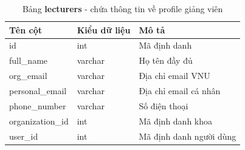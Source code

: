 \documentclass[./../main.tex]{subfiles}
\begin{document}
\begin{table}[H]
	\caption[Bảng lecturers]{Bảng \textbf{lecturers} - chứa thông tin về profile giảng viên}
	\label{tab:db_lecturers}
	\begin{tabular}{|l|l|l|}
	\hline
	\textbf{Tên cột} & \textbf{Kiểu dữ liệu} & \textbf{Mô tả}          \\ \hline
	id               & int                   & Mã định danh            \\ \hline
	full\_name       & varchar               & Họ tên đầy đủ           \\ \hline
	org\_email       & varchar               & Địa chỉ email VNU       \\ \hline
	personal\_email  & varchar               & Địa chỉ email cá nhân   \\ \hline
	phone\_number    & varchar               & Số điện thoại           \\ \hline
	organization\_id & int                   & Mã định danh khoa       \\ \hline
	user\_id         & int                   & Mã định danh người dùng \\ \hline
	\end{tabular}%
\end{table}
\end{document}
